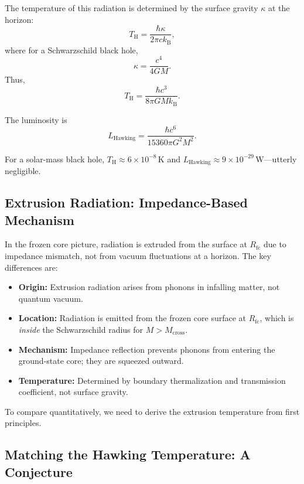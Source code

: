 \documentclass[12pt,a4paper]{article}
\newcommand{\Rfc}{R_\text{fc}}
\newcommand{\Mcross}{M_\text{cross}}
\newcommand{\TH}{T_\text{H}}
\theoremstyle{definition}
\begin{document}
The temperature of this radiation is determined by the surface gravity $\kappa$ at the horizon:
\begin{equation}
\TH = \frac{\hbar \kappa}{2\pi c k_\text{B}},
\label{eq:T_Hawking_kappa}
\end{equation}
where for a Schwarzschild black hole,
\begin{equation}
\kappa = \frac{c^4}{4GM}.
\end{equation}
Thus,
\begin{equation}
\TH = \frac{\hbar c^3}{8\pi G M k_\text{B}}.
\label{eq:T_Hawking}
\end{equation}

The luminosity is
\begin{equation}
L_\text{Hawking} = \frac{\hbar c^6}{15360 \pi G^2 M^2}.
\label{eq:L_Hawking_full}
\end{equation}

For a solar-mass black hole, $\TH \approx 6 \times 10^{-8}\,\text{K}$ and $L_\text{Hawking} \approx 9 \times 10^{-29}\,\text{W}$—utterly negligible.

\subsection{Extrusion Radiation: Impedance-Based Mechanism}
\label{subsec:extrusion_vs_hawking}

In the frozen core picture, radiation is extruded from the surface at $\Rfc$ due to impedance mismatch, not from vacuum fluctuations at a horizon. The key differences are:

\begin{itemize}
  \item \textbf{Origin:} Extrusion radiation arises from phonons in infalling matter, not quantum vacuum.
  \item \textbf{Location:} Radiation is emitted from the frozen core surface at $\Rfc$, which is \emph{inside} the Schwarzschild radius for $M > \Mcross$.
  \item \textbf{Mechanism:} Impedance reflection prevents phonons from entering the ground-state core; they are squeezed outward.
  \item \textbf{Temperature:} Determined by boundary thermalization and transmission coefficient, not surface gravity.
\end{itemize}

To compare quantitatively, we need to derive the extrusion temperature from first principles.

\subsection{Matching the Hawking Temperature: A Conjecture}
\label{subsec:matching_conjecture}
\end{document}
